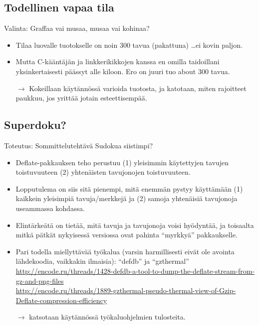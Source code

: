 \documentclass[pdf,10pt]{beamer}
\begin{document}
\subsection{Todellinen vapaa tila}
\begin{frame}{Valinta: Graffaa vai musaa, musaa vai kohinaa?}
  \begin{itemize}
  \item Tilaa luovalle tuotokselle on noin 300 tavua (pakattuna)
    \ldots ei kovin paljon.
  \item Mutta C-kääntäjän ja linkkerikikkojen kanssa en omilla
    taidoillani yksinkertaisesti päässyt alle kiloon. Ero on juuri tuo
    about 300 tavua.
    \item[$\rightarrow$] Kokeillaan käytännössä varioida tuotosta, ja
      katotaan, miten rajoitteet paukkuu, jos yrittää jotain
      esteettisempää.
  \end{itemize}
\end{frame}


\subsection{Superdoku?}
\begin{frame}{Toteutus: Sommittelutehtävä Sudokua siistimpi?}
  \begin{itemize}
    \item Deflate-pakkauksen teho perustuu (1) yleisimmin käytettyjen
      tavujen toistuvuuteen (2) yhtenäisten tavujonojen
      toistuvuuteen.
    \item Lopputulema on siis sitä pienempi, mitä enemmän pystyy
      käyttämään (1) kaikkein yleisimpiä tavuja/merkkejä ja (2) samoja
      yhtenäisiä tavujonoja useammassa kohdassa.
    \item Elintärkeätä on tietää, mitä tavuja ja tavujonoja voisi
      hyödyntää, ja toisaalta mitkä pätkät nykyisessä versiossa ovat
      pahinta ``myrkkyä'' pakkaukselle.
    \item Pari todella miellyttävää työkalua (varsin harmillisesti
      eivät ole avointa lähdekoodia, vaikkakin ilmaisia): ``defdb'' ja
      ``gzthermal''\\{\tiny
      \url{http://encode.ru/threads/1428-defdb-a-tool-to-dump-the-deflate-stream-from-gz-and-png-files}\\
      \url{http://encode.ru/threads/1889-gzthermal-pseudo-thermal-view-of-Gzip-Deflate-compression-efficiency}\\}
    \item[$\rightarrow$] katsotaan käytännössä työkaluohjelmien tulosteita.
  \end{itemize}
\end{frame}
\end{document}
